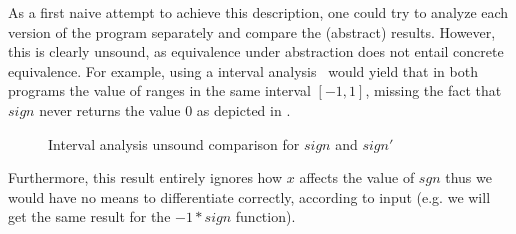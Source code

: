 As a first naive attempt to achieve this description, one could try to analyze each version of the program separately and compare the (abstract) results. However, this is clearly unsound, as equivalence under abstraction does not entail concrete equivalence. For example, using a interval analysis~\cite{TODO} would yield that in both programs the value of  ranges in the same interval $[-1,1]$, missing the fact that $sign$ never returns the value $0$ as depicted in .
\begin{figure}
\caption{Interval analysis unsound comparison for $sign$ and $sign'$}
\end{figure}
Furthermore, this result entirely ignores how $x$ affects the value of $sgn$ thus we would have no means to differentiate correctly, according to input (e.g. we will get the same result for the $-1 * sign$ function).

